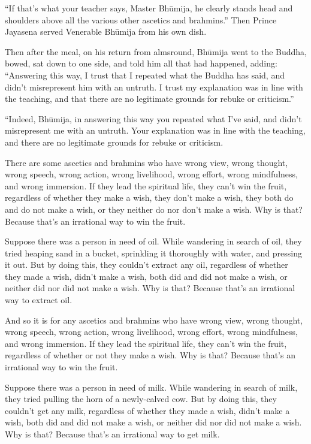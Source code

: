 \documentclass[12pt,openany]{book}%
\begin{document}
“If that’s what your teacher says, Master \textsanskrit{Bhūmija}, he clearly stands head and shoulders above all the various other ascetics and brahmins.” Then Prince Jayasena served Venerable \textsanskrit{Bhūmija} from his own dish. 

Then after the meal, on his return from almsround, \textsanskrit{Bhūmija} went to the Buddha, bowed, sat down to one side, and told him all that had happened, adding: “Answering this way, I trust that I repeated what the Buddha has said, and didn’t misrepresent him with an untruth. I trust my explanation was in line with the teaching, and that there are no legitimate grounds for rebuke or criticism.” 

“Indeed, \textsanskrit{Bhūmija}, in answering this way you repeated what I’ve said, and didn’t misrepresent me with an untruth. Your explanation was in line with the teaching, and there are no legitimate grounds for rebuke or criticism. 

There are some ascetics and brahmins who have wrong view, wrong thought, wrong speech, wrong action, wrong livelihood, wrong effort, wrong mindfulness, and wrong immersion. If they lead the spiritual life, they can’t win the fruit, regardless of whether they make a wish, they don’t make a wish, they both do and do not make a wish, or they neither do nor don’t make a wish. Why is that? Because that’s an irrational way to win the fruit. 

Suppose there was a person in need of oil. While wandering in search of oil, they tried heaping sand in a bucket, sprinkling it thoroughly with water, and pressing it out. But by doing this, they couldn’t extract any oil, regardless of whether they made a wish, didn’t make a wish, both did and did not make a wish, or neither did nor did not make a wish. Why is that? Because that’s an irrational way to extract oil. 

And so it is for any ascetics and brahmins who have wrong view, wrong thought, wrong speech, wrong action, wrong livelihood, wrong effort, wrong mindfulness, and wrong immersion. If they lead the spiritual life, they can’t win the fruit, regardless of whether or not they make a wish. Why is that? Because that’s an irrational way to win the fruit. 

Suppose there was a person in need of milk. While wandering in search of milk, they tried pulling the horn of a newly-calved cow. But by doing this, they couldn’t get any milk, regardless of whether they made a wish, didn’t make a wish, both did and did not make a wish, or neither did nor did not make a wish. Why is that? Because that’s an irrational way to get milk. 
\end{document}
